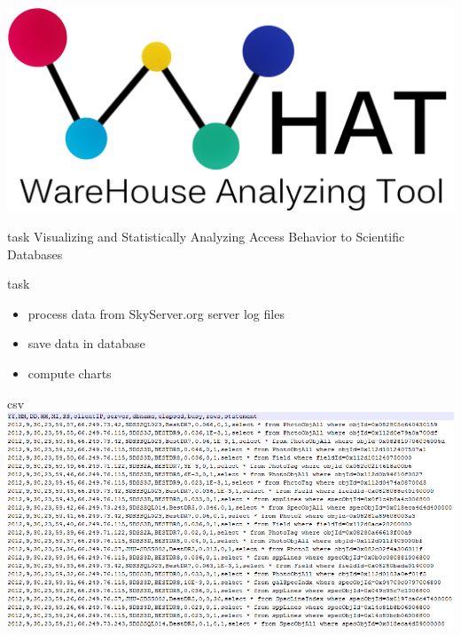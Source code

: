 \documentclass[xcolor=dvipsnames]{beamer}
\begin{document}

\begin{frame}
\begin{center}
\includegraphics[width =0.7\linewidth]{Pictures/WHAT-Logo2.png}
\end{center}

\end{frame}
% 



\begin{frame}{task}
\huge{Visualizing and Statistically Analyzing Access Behavior to Scientific Databases}

\end{frame}


\begin{frame}{task}
\begin{itemize}
  \item<2-> process data from SkyServer.org server log files
  \item<3-> save data in database
  \item<4-> compute charts
\end{itemize}
\end{frame}

\begin{frame}{csv}
	\includegraphics[width=1\linewidth]{Pictures/csv.png}
\end{frame}
\end{document}
